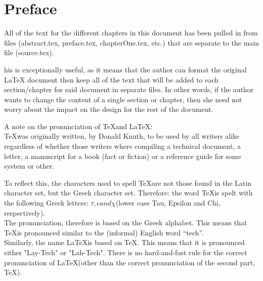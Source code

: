\chapter*{Preface}

All of the text for the different chapters in this document has been pulled in from files (abstract.tex, preface.tex, chapterOne.tex, etc.) that are separate to the main file (source.tex).
\par his is exceptionally useful, as it means that the author can format the original \LaTeX{} document then keep all of the text that will be added to each section/chapter for said document in separate files. In other words, if the author wants to change the content of a single section or chapter, then she need not worry about the impact on the design for the rest of the document.
\par A note on the pronunciation of \TeX and \LaTeX:\\
\indent{}\TeX was originally written, by Donald Knuth, to be used by all writers alike regardless of whether those writers where compiling a technical document, a letter, a manuscript for a book (fact or fiction) or a reference guide for some system or other.
\par To reflect this, the characters used to spell \TeX are not those found in the Latin character set, but the Greek character set. Therefore: the word \TeX is spelt with the following Greek letters:
\begin{math}
\tau, \epsilon and \chi
\end{math}(lower case Tau, Epsilon and Chi, respectively).\\
\indent{}The pronunciation, therefore is based on the Greek alphabet. This means that \TeX is pronounced similar to the (informal) English word ``tech''.\\
\indent{}Similarly, the name \LaTeX is based on \TeX. This means that it is pronounced either "Lay-Tech" or "Lah-Tech". There is no hard-and-fast rule for the correct  pronunciation of \LaTeX (other than the correct pronunciation of the second part, \TeX).




